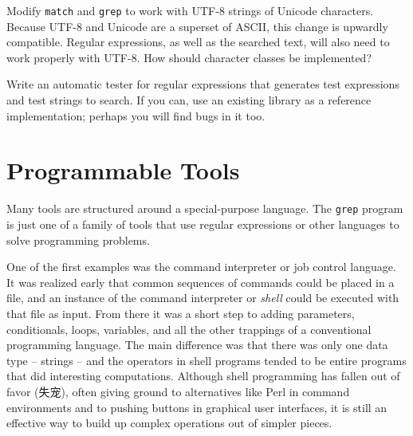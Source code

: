 \begin{exercise}
    Modify \verb'match' and \verb'grep' to work with UTF-8 strings of
    Unicode characters. Because UTF-8 and Unicode are a superset of ASCII,
    this change is upwardly compatible. Regular expressions, as well as the
    searched text, will also need to work properly with UTF-8. How should
    character classes be implemented?
\end{exercise}

\begin{exercise}
    Write an automatic tester for regular expressions that generates test
    expressions and test strings to search. If you can, use an existing
    library as a reference implementation; perhaps you will find bugs in it
    too.
\end{exercise}

\section{Programmable Tools}
\label{sec:programmable_tools}

Many tools are structured around a special-purpose language. The
\verb'grep' program is just one of a family of tools that use regular
expressions or other languages to solve programming problems.

One of the first examples was the command interpreter or job control
language. It was realized early that common sequences of commands could be
placed in a file, and an instance of the command interpreter or
\textit{shell} could be executed with that file as input. From there it was
a short step to adding parameters, conditionals, loops, variables, and all
the other trappings of a conventional programming language.  The main
difference was that there was only one data type -- strings -- and the
operators in shell programs tended to be entire programs that did
interesting computations.  Although shell programming has fallen out of
favor (失宠), often giving ground to alternatives like Perl in command
environments and to pushing buttons in graphical user interfaces, it is
still an effective way to build up complex operations out of simpler
pieces.

